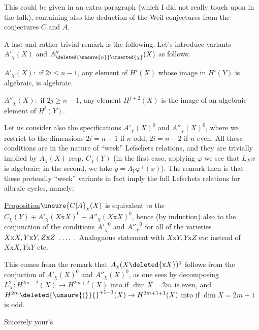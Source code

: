 
This could be given in an extra paragraph (which I did not really touch upon in the talk), containing also the deduction of the Weil conjectures from the conjectures $C$ and $A$.

A last and rather trivial remark is the following. Let's introduce  variants $A'_{\chi}(X)$ and $A''_{\deleted{\unsure{n}}\inserted{\chi}}(X)$ as follows:

$A'_{\chi}(X):$ if $2i\leq n-1$, any element  of $H^i(X)$ whose image in $H^i(Y)$ is algebraic, is algebraic.

$A''_{\chi}(X):$ if $2j\geq n-1$, any  element   $H^{j+2}(X)$ is  the image of an algebraic element of $H^i(Y)$.

Let us consider also the specifications $A'_{\chi}(X)^0$ and $A''_{\chi}(X)^0$, where we restrict to the  dimensions $2i=n-1$ if $n$ odd, $2i=n-2$ if $n$ even. All these conditions are in the nature of ``week'' Lefschets relations, and they are trivially implied by $A_{\chi}(X)$ resp. $C_{\chi}(Y)$ (in the first case, applying $\varphi$ we see that $L_Xx$ is algebraic; in the second, we take $y=\Lambda_Y\varphi^{+}(x)$). The remark then is that these pretendly ``week'' variants in fact imply the full Lefschets relations for albraic cycles, namely:

\uline{Proposition}\quad $\unsure{C|A}_{\chi}(X)$ is equivalent to the  $C_{\chi}(Y)+A'_{\chi}(X\mathrm{x} X)^0+A''_{\chi}(X\mathrm{x} X)^0$, hence (by induction) also to the conjunction of the conditions ${A'_{\chi}}^0$ and ${A''_{\chi}}^0$ for all of the varieties $X\mathrm{x} X,Y\mathrm{x} Y,Z\mathrm{x} Z\ \mathinner{\ldotp\ldotp\ldotp\ldotp}\ .$ Analoguous statement with $X\mathrm{x} Y,Y\mathrm{x} Z$ etc instead of $X\mathrm{x} X,Y\mathrm{x} Y$ etc.

This comes from the remark that  $A_{\chi}(X\deleted{\mathrm{x} X})^0$ follows from the conjuction of $A'_{\chi}(X)^0$ and $A''_{\chi}(X)^0$, as one sees by decomposing $L_X^2:H^{2m-2}(X)\to H^{2m+2}(X)$ into
if $\dim X=2m$ is even, and $H^{2m}\deleted{\unsure{(}}{}^{+1-1}(X)\to H^{2m+1+1}(X)$ into
if $\dim X=2m+1$ is odd.

Sincerely your's

